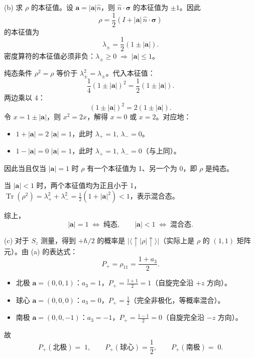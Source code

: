 \begin{solution}
(b) 求 $\rho$ 的本征值。设 $\mathbf a = |\mathbf a|\hat n$，则 $\hat n\cdot\boldsymbol\sigma$ 的本征值为 $\pm 1$。因此
\[
\rho = \frac12(I + |\mathbf a|\,\hat n\cdot\boldsymbol\sigma)
\]
的本征值为
\[
\lambda_\pm = \frac12(1 \pm |\mathbf a|).
\]
密度算符的本征值必须非负：$\lambda_\pm \ge 0 \;\Longrightarrow\; |\mathbf a| \le 1$。

纯态条件 $\rho^2 = \rho$ 等价于 $\lambda_\pm^2 = \lambda_\pm$。代入本征值：
\[
\frac14(1\pm|\mathbf a|)^2 = \frac12(1\pm|\mathbf a|).
\]
两边乘以 4：
\[
(1\pm|\mathbf a|)^2 = 2(1\pm|\mathbf a|).
\]
令 $x = 1\pm|\mathbf a|$，则 $x^2 = 2x$，解得 $x=0$ 或 $x=2$。对应地：
\begin{itemize}
\item $1+|\mathbf a| = 2$ \;\Longrightarrow\; $|\mathbf a| = 1$，此时 $\lambda_+ = 1$, $\lambda_- = 0$。
\item $1-|\mathbf a| = 0$ \;\Longrightarrow\; $|\mathbf a| = 1$，此时 $\lambda_+ = 1$, $\lambda_- = 0$（与上同）。
\end{itemize}
因此当且仅当 $|\mathbf a| = 1$ 时 $\rho$ 有一个本征值为 1、另一个为 0，即 $\rho$ 是纯态。

当 $|\mathbf a| < 1$ 时，两个本征值均为正且小于 1，$\operatorname{Tr}(\rho^2) = \lambda_+^2 + \lambda_-^2 = \frac12(1+|\mathbf a|^2) < 1$，表示混合态。

综上，
\[
\boxed{|\mathbf a| = 1 \;\Longleftrightarrow\; \text{纯态},\qquad
|\mathbf a| < 1 \;\Longleftrightarrow\; \text{混合态}.}
\]

(c) 对于 $S_z$ 测量，得到 $+\hbar/2$ 的概率是 $|\langle\uparrow|\rho|\uparrow\rangle|$（实际上是 $\rho$ 的 $(1,1)$ 矩阵元）。由 (a) 的表达式：
\[
P_+ = \rho_{11} = \frac{1+a_3}{2}.
\]
\begin{itemize}
\item 北极 $\mathbf a = (0,0,1)$：$a_3 = 1$，$P_+ = \frac{1+1}{2} = 1$（自旋完全沿 $+z$ 方向）。
\item 球心 $\mathbf a = (0,0,0)$：$a_3 = 0$，$P_+ = \frac{1}{2}$（完全非极化，等概率混合）。
\item 南极 $\mathbf a = (0,0,-1)$：$a_3 = -1$，$P_+ = \frac{1-1}{2} = 0$（自旋完全沿 $-z$ 方向）。
\end{itemize}
故
\[
\boxed{P_+(\text{北极})=\;1,\qquad P_+(\text{球心})=\frac12,\qquad P_+(\text{南极})=\;0.}
\]


\end{solution}
